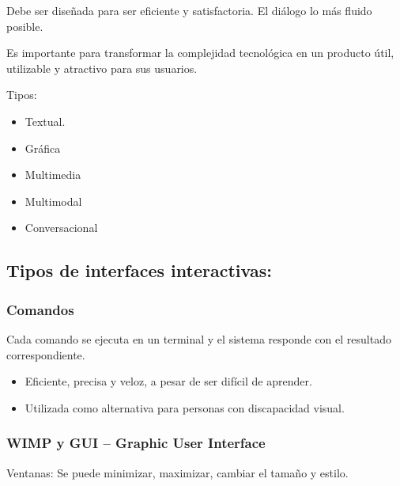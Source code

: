 \documentclass[12pt, twoside, openright]{report} %
\begin{document}
	Debe ser diseñada para ser eficiente y satisfactoria. El diálogo lo
    más fluido posible.

	Es importante para transformar la complejidad tecnológica en un
    producto útil, utilizable y atractivo para sus usuarios.

	Tipos:

    \begin{itemize}
    
    \item
      Textual.
    \item
      Gráfica
    \item
      Multimedia
    \item
      Multimodal
    \item
      Conversacional
    \end{itemize}

\subsection{Tipos de interfaces interactivas:}

\subsubsection{Comandos}
Cada comando se ejecuta en un terminal y el sistema
      responde con el resultado correspondiente.

      \begin{itemize}
      
      \item
        Eficiente, precisa y veloz, a pesar de ser difícil de aprender.
      \item
        Utilizada como alternativa para personas con discapacidad
        visual.
      \end{itemize}
\pagebreak
	 \subsubsection{WIMP y GUI -- Graphic User Interface} 

        Ventanas: Se puede minimizar, maximizar, cambiar el tamaño y
        estilo.
\end{document}

